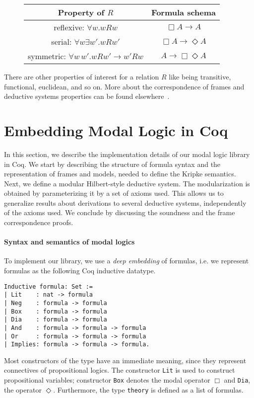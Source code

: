 \documentclass[sigconf]{acmart}
\begin{document}
\begin{figure}[H]
\begin{tabular}{|c|c|}
  \hline
  Property of $R$                          & Formula schema \\ \hline
  reflexive: $\forall w.wRw$               & $\Box A \to A$ \\ 
  serial: $\forall w\exists w'. wRw'$      & $\Box A \to \Diamond A$ \\
  symmetric: $\forall w\,w'.wRw' \to w'Rw$ & $A \to \Box\Diamond A$ \\
  \hline
\end{tabular}
\end{figure}
There are other properties of interest for a relation $R$ like being
transitive, functional, euclidean, and so on. More about the correspondence
of frames and deductive systems properties can be found elsewhere~\cite{Chellas,blackburn}.

\section{Embedding Modal Logic in Coq}\label{sec:implementation}

In this section, we describe the implementation details of our modal logic
library in Coq. We start by describing the structure of formula syntax and the
representation of frames and models, needed to define the Kripke semantics.
Next, we define a modular Hilbert-style deductive system. The modularization is
obtained by parameterizing it by a set of axioms used. This allows us to
generalize results about derivations to several deductive systems, independently
of the axioms used. We conclude by discussing the soundness and the frame
correspondence proofs.

\paragraph{Syntax and semantics of modal logics}
To implement our library, we use a \emph{deep embedding} of
formulas, i.e. we represent formulas as the following Coq inductive datatype.
\begin{verbatim}
Inductive formula: Set :=
| Lit    : nat -> formula
| Neg    : formula -> formula
| Box    : formula -> formula
| Dia    : formula -> formula
| And    : formula -> formula -> formula
| Or     : formula -> formula -> formula
| Implies: formula -> formula -> formula.
\end{verbatim}
Most constructors of the type have an immediate meaning, since they represent
connectives of propositional logics. The constructor \texttt{Lit}
is used to construct propositional variables; constructor \texttt{Box}
denotes the modal operator $\Box$ and \texttt{Dia}, the operator
$\Diamond$. Furthermore, the type \texttt{theory} is defined as a list
of formulas.
\end{document}
